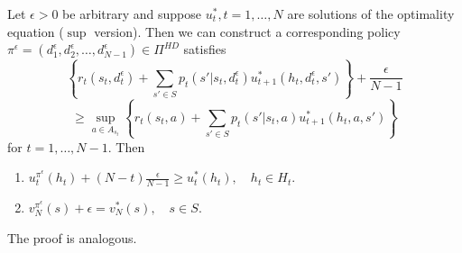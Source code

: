 \begin{theorem}
    Let $ \epsilon > 0 $ be arbitrary and suppose $ u^*_t, t = 1, \ldots, N $ are solutions of the optimality equation ($ \sup $ version). 
    Then we can construct a corresponding policy $ \pi^\epsilon  = (d^\epsilon_1, d^\epsilon_2, \ldots, d^\epsilon_{N-1}) \in \Pi^{HD}$ satisfies
    \[
        \left\{ r_t(s_t, d^\epsilon_t) + \sum^{}_{s' \in S} p_t(s' | s_t, d^\epsilon_t) u^*_{t+1}(h_t, d^\epsilon_t, s') \right\} + \frac{\epsilon}{N-1} 
    \]
    \[
        \ge \sup_{a \in A_{s_t}} \left\{ r_t(s_t, a) + \sum^{}_{s' \in S} p_t(s' | s_t, a) u^*_{t+1}(h_t, a, s') \right\}
    \]
    for $ t = 1, \ldots, N-1 $.
    Then
    \begin{enumerate}
        \item $ u^{\pi^\epsilon}_t(h_t) + (N-t) \frac{\epsilon}{N-1} \ge u^*_t(h_t), \quad h_t \in H_t $.
        \item $ v^{\pi^\epsilon}_N(s) + \epsilon = v^*_N(s) , \quad s \in S$.
    \end{enumerate}
    The proof is analogous.
\end{theorem}


